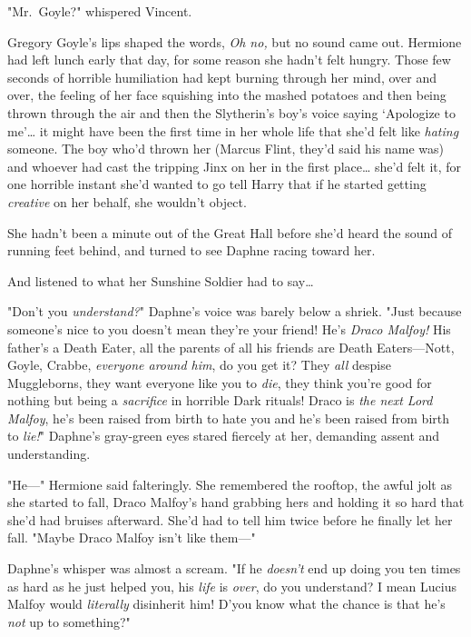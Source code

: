 "Mr.~Goyle?" whispered Vincent.

Gregory Goyle's lips shaped the words, \emph{Oh no,} but no sound came out.
\later
Hermione had left lunch early that day, for some reason she hadn't felt hungry.
Those few seconds of horrible humiliation had kept burning through her mind,
over and over, the feeling of her face squishing into the mashed potatoes and
then being thrown through the air and then the Slytherin's boy's voice saying
`Apologize to me'{\ldots} it might have been the first time in her whole life
that she'd felt like \emph{hating} someone. The boy who'd thrown her (Marcus
Flint, they'd said his name was) and whoever had cast the tripping Jinx on her
in the first place{\ldots} she'd felt it, for one horrible instant she'd wanted
to go tell Harry that if he started getting \emph{creative} on her behalf, she
wouldn't object.

She hadn't been a minute out of the Great Hall before she'd heard the sound of
running feet behind, and turned to see Daphne racing toward her.

And listened to what her Sunshine Soldier had to say{\ldots}

"Don't you \emph{understand?}" Daphne's voice was barely below a shriek. "Just
because someone's nice to you doesn't mean they're your friend! He's
\emph{Draco Malfoy!} His father's a Death Eater, all the parents of all his
friends are Death Eaters---Nott, Goyle, Crabbe, \emph{everyone around him}, do
you get it? They \emph{all} despise Muggleborns, they want everyone like you to
\emph{die}, they think you're good for nothing but being a \emph{sacrifice} in
horrible Dark rituals! Draco is \emph{the next Lord Malfoy}, he's been raised
from birth to hate you and he's been raised from birth to \emph{lie!}" Daphne's
gray-green eyes stared fiercely at her, demanding assent and understanding.

"He---" Hermione said falteringly. She remembered the rooftop, the awful jolt
as she started to fall, Draco Malfoy's hand grabbing hers and holding it so
hard that she'd had bruises afterward. She'd had to tell him twice before he
finally let her fall. "Maybe Draco Malfoy isn't like them---"

Daphne's whisper was almost a scream. "If he \emph{doesn't} end up doing you
ten times as hard as he just helped you, his \emph{life} is \emph{over}, do you
understand? I mean Lucius Malfoy would \emph{literally} disinherit him! D'you
know what the chance is that he's \emph{not} up to something?"

